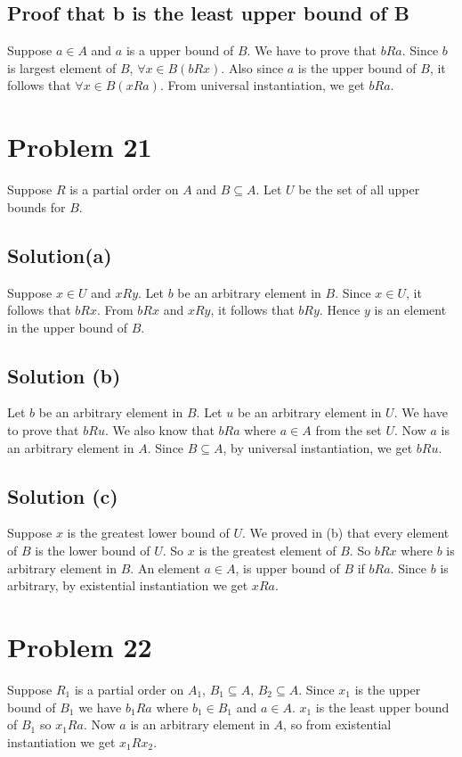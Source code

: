 \documentclass{article}
\begin{document}
\subsection{Proof that b is the least upper bound of B}
Suppose $a \in A$ and $a$ is a upper bound of $B$. We have to prove
that $bRa$. Since $b$ is largest element of $B$, $\forall x \in
B(bRx)$. Also since $a$ is the upper bound of $B$, it follows that
$\forall x \in B(xRa)$. From universal instantiation, we get $bRa$.

\section{Problem 21}
Suppose $R$ is a partial order on $A$ and $B \subseteq A$. Let $U$ be
the set of all upper bounds for $B$.
\subsection{Solution(a)}
Suppose $x \in U$ and $xRy$. Let $b$ be an arbitrary element in $B$.
Since $x \in U$, it follows that $bRx$. From $bRx$ and $xRy$, it
follows that $bRy$. Hence $y$ is an element in the upper bound of $B$.
\subsection{Solution (b)}
Let $b$ be an arbitrary element in $B$. Let $u$ be an arbitrary
element in $U$. We have to prove that $bRu$. We also know that $bRa$
where $a \in A$ from the set $U$. Now $a$ is an arbitrary element in
$A$. Since $B \subseteq A$, by universal instantiation, we get $bRu$.
\subsection{Solution (c)}
Suppose $x$ is the greatest lower bound of $U$. We proved in (b) that
every element of $B$ is the lower bound of $U$. So $x$ is the greatest
element of $B$. So $bRx$ where $b$ is arbitrary element in $B$. An
element $a \in A$, is upper bound of $B$ if $bRa$. Since $b$ is
arbitrary, by existential instantiation we get $xRa$.

\section{Problem 22}
Suppose $R_1$ is a partial order on $A_1$, $B_1 \subseteq A$, $B_2
\subseteq A$. Since $x_1$ is the upper bound of $B_1$ we have $b_1Ra$
where $b_1 \in B_1$ and $a \in A$. $x_1$ is the least upper bound of
$B_1$ so $x_1Ra$. Now $a$ is an arbitrary element in $A$, so from
existential instantiation we get $x_1Rx_2$.
\end{document}
